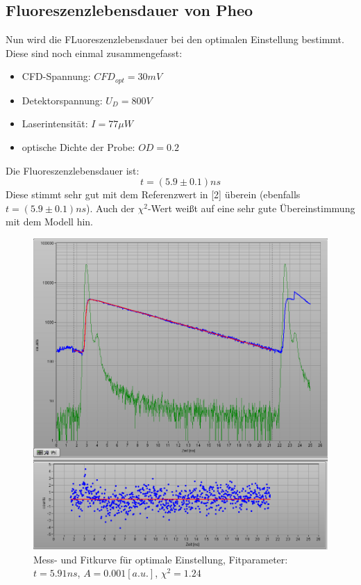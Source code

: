 \documentclass{article}
\begin{document}
\subsection{Fluoreszenzlebensdauer von Pheo}
Nun wird die FLuoreszenzlebensdauer bei den optimalen Einstellung bestimmt. Diese sind noch einmal zusammengefasst:

\begin{itemize}
  \item CFD-Spannung: $CFD_{opt}=30mV$
  \item Detektorspannung: $U_D=800V$
  \item Laserintensität: $I=77\mu W$
  \item optische Dichte der Probe: $OD=0.2$
\end{itemize}

Die Fluoreszenzlebensdauer ist: $$t=(5.9 \pm 0.1)ns$$
Diese stimmt sehr gut mit dem Referenzwert in [2] überein (ebenfalls $t=(5.9 \pm 0.1)ns$). Auch der $\chi^2$-Wert weißt auf
eine sehr gute Übereinstimmung mit dem Modell hin.

\begin{figure}[h]
  \centering
  \includegraphics[width=\textwidth]{Bilder/messung_opt.jpg}
  \caption{Mess- und Fitkurve für optimale Einstellung, Fitparameter: $t=5.91ns$, $A=0.001[a.u.]$, $\chi^2=1.24$}
\end{figure}
\end{document}
